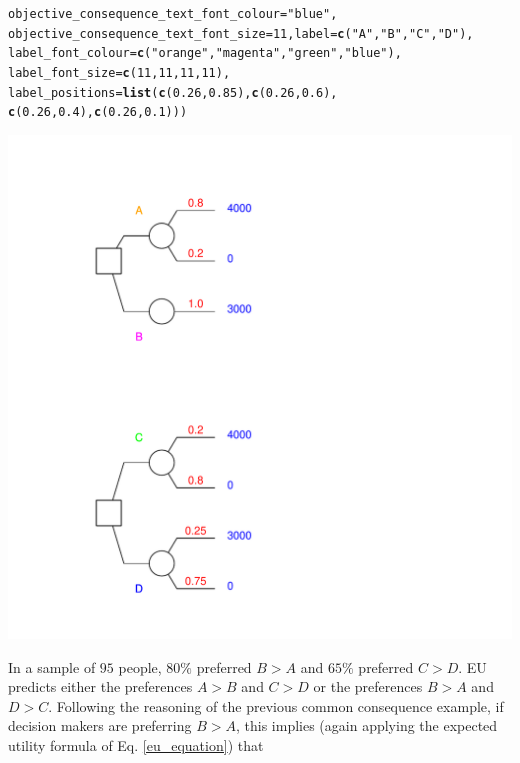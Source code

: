 \documentclass{article}\usepackage[]{graphicx}\usepackage[]{color}
\makeatletter
\newcommand{\hlnum}[1]{\textcolor[rgb]{0.686,0.059,0.569}{#1}}%
\newcommand{\hlstr}[1]{\textcolor[rgb]{0.192,0.494,0.8}{#1}}%
\newcommand{\hlstd}[1]{\textcolor[rgb]{0.345,0.345,0.345}{#1}}%
\newcommand{\hlkwc}[1]{\textcolor[rgb]{0.333,0.667,0.333}{#1}}%
\newcommand{\hlkwd}[1]{\textcolor[rgb]{0.737,0.353,0.396}{\textbf{#1}}}%
\newenvironment{kframe}{%
 \def\at@end@of@kframe{}%
 \ifinner\ifhmode%
  \def\at@end@of@kframe{\end{minipage}}%
  \begin{minipage}{\columnwidth}%
 \fi\fi%
 \def\FrameCommand##1{\hskip\@totalleftmargin \hskip-\fboxsep
 \colorbox{shadecolor}{##1}\hskip-\fboxsep
     \hskip-\linewidth \hskip-\@totalleftmargin \hskip\columnwidth}%
 \MakeFramed {\advance\hsize-\width
   \@totalleftmargin\z@ \linewidth\hsize
   \@setminipage}}%
 {\par\unskip\endMakeFramed%
 \at@end@of@kframe}
\newenvironment{knitrout}{}{} %
\makeatother
\begin{document}
\begin{knitrout}
\begin{kframe}
\begin{alltt}
        \hlkwc{objective_consequence_text_font_colour}\hlstd{=}\hlstr{"blue"}\hlstd{,}
        \hlkwc{objective_consequence_text_font_size}\hlstd{=}\hlnum{11}\hlstd{,} \hlkwc{label}\hlstd{=}\hlkwd{c}\hlstd{(}\hlstr{"A"}\hlstd{,}\hlstr{"B"}\hlstd{,}\hlstr{"C"}\hlstd{,} \hlstr{"D"}\hlstd{),}
        \hlkwc{label_font_colour}\hlstd{=}\hlkwd{c}\hlstd{(}\hlstr{"orange"}\hlstd{,}\hlstr{"magenta"}\hlstd{,}\hlstr{"green"}\hlstd{,}\hlstr{"blue"}\hlstd{),}
        \hlkwc{label_font_size}\hlstd{=}\hlkwd{c}\hlstd{(}\hlnum{11}\hlstd{,}\hlnum{11}\hlstd{,}\hlnum{11}\hlstd{,}\hlnum{11}\hlstd{),}
        \hlkwc{label_positions}\hlstd{=}\hlkwd{list}\hlstd{(}\hlkwd{c}\hlstd{(}\hlnum{0.26}\hlstd{,}\hlnum{0.85}\hlstd{),}\hlkwd{c}\hlstd{(}\hlnum{0.26}\hlstd{,}\hlnum{0.6}\hlstd{),}
                \hlkwd{c}\hlstd{(}\hlnum{0.26}\hlstd{,}\hlnum{0.4}\hlstd{),}\hlkwd{c}\hlstd{(}\hlnum{0.26}\hlstd{,}\hlnum{0.1}\hlstd{)))}
\end{alltt}
\end{kframe}

{\centering \includegraphics[width=0.8\linewidth]{figure/unnamed-chunk-12} 

}



\end{knitrout}


In a sample of $95$ people, $80\%$ preferred $B > A$ and $65\%$ preferred $C > D$.
EU predicts either the preferences $A > B$ and $C > D$ or the preferences $B > A$ and $D > C$.
Following the reasoning of the previous common consequence example,
if decision makers are preferring $B > A$, this implies (again applying the expected utility formula of Eq. \eqref{eu_equation}) that
\end{document}

